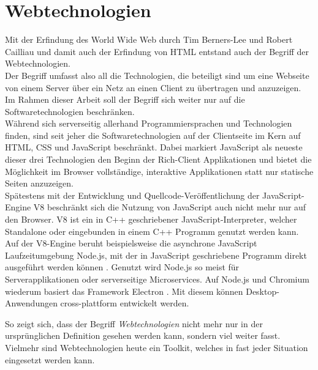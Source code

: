 \section{Webtechnologien}
\label{section:webtechnologien}

Mit der Erfindung des World Wide Web durch Tim Berners-Lee und Robert Cailliau und damit auch der Erfindung 
von HTML \cite{www} entstand auch der Begriff der Webtechnologien.\\
Der Begriff umfasst also all die Technologien, die beteiligt sind um eine Webseite von einem Server über ein 
Netz an einen Client zu übertragen und anzuzeigen.\\

Im Rahmen dieser Arbeit soll der Begriff sich weiter nur auf die Softwaretechnologien beschränken.\\
Während sich serverseitig allerhand Programmiersprachen und Technologien finden, sind seit jeher die Softwaretechnologien
auf der Clientseite im Kern auf HTML, CSS und JavaScript beschränkt. Dabei markiert JavaScript als neueste dieser
drei Technologien \cite{jspress} den Beginn der Rich-Client Applikationen und bietet die Möglichkeit im Browser 
vollständige, interaktive Applikationen statt nur statische Seiten anzuzeigen.\\
Spätestens mit der Entwicklung und Quellcode-Veröffentlichung der JavaScript-Engine V8 \cite{v8} beschränkt sich die Nutzung
von JavaScript auch nicht mehr nur auf den Browser. V8 ist ein in C++ geschriebener JavaScript-Interpreter,
welcher Standalone oder eingebunden in einem C++ Programm genutzt werden kann.\\
Auf der V8-Engine beruht beispielsweise die asynchrone JavaScript Laufzeitumgebung Node.js, mit der in 
JavaScript geschriebene Programm direkt ausgeführt werden können \cite{node}. Genutzt wird Node.js so meist für Serverapplikationen
oder serverseitige Microservices.
Auf Node.js und Chromium wiederum basiert das Framework Electron \cite{electron}. Mit diesem können Desktop-Anwendungen
cross-plattform entwickelt werden.

So zeigt sich, dass der Begriff \emph{Webtechnologien} nicht mehr nur in der ursprünglichen Definition gesehen werden kann,
sondern viel weiter fasst. Vielmehr sind Webtechnologien heute ein Toolkit, welches in fast jeder Situation eingesetzt werden
kann. 


% 